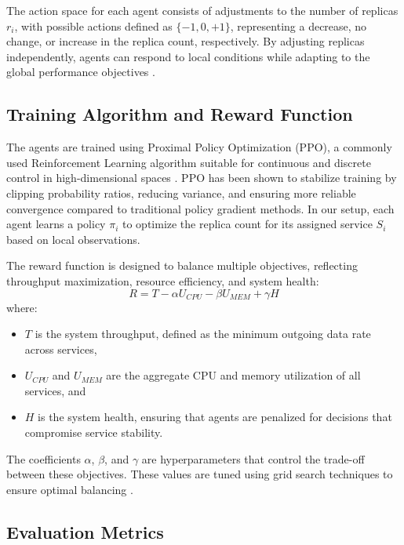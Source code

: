 \documentclass[conference]{IEEEtran}
\begin{document}
The action space for each agent consists of adjustments to the number of replicas $\mathit{r_i}$, with possible actions defined as $\{-1, 0, +1\}$, representing a decrease, no change, or increase in the replica count, respectively. By adjusting replicas independently, agents can respond to local conditions while adapting to the global performance objectives \cite{zhang_marl_k8s}.

\subsection{Training Algorithm and Reward Function}

The agents are trained using Proximal Policy Optimization (PPO), a commonly used Reinforcement Learning algorithm suitable for continuous and discrete control in high-dimensional spaces \cite{schulman_ppo}. PPO has been shown to stabilize training by clipping probability ratios, reducing variance, and ensuring more reliable convergence compared to traditional policy gradient methods. In our setup, each agent learns a policy $\pi_i$ to optimize the replica count for its assigned service $S_i$ based on local observations.

The reward function is designed to balance multiple objectives, reflecting throughput maximization, resource efficiency, and system health:
\begin{equation}
    R = T - \alpha U_{CPU} - \beta U_{MEM} + \gamma H
\end{equation}
where:
\begin{itemize}
    \item $T$ is the system throughput, defined as the minimum outgoing data rate across services,
    \item $U_{CPU}$ and $U_{MEM}$ are the aggregate CPU and memory utilization of all services, and
    \item $H$ is the system health, ensuring that agents are penalized for decisions that compromise service stability.
\end{itemize}
The coefficients $\alpha$, $\beta$, and $\gamma$ are hyperparameters that control the trade-off between these objectives. These values are tuned using grid search techniques to ensure optimal balancing \cite{wu_multi_objective_rl}.

\subsection{Evaluation Metrics}
\end{document}
